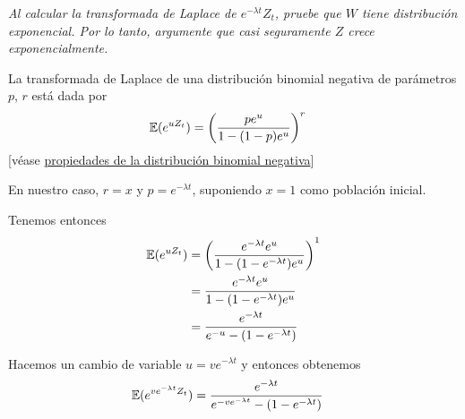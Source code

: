 \emph{
    Al calcular la transformada de Laplace de $e^{-\lambda t}Z_t$, pruebe que $W$ tiene 
    distribuci\'on exponencial. Por lo tanto, argumente que casi seguramente $Z$ crece exponencialmente.
    \pn
}
\afterstatement\pn

La transformada de Laplace de una distribución binomial negativa de parámetros $p$, $r$ está dada por
\begin{align}
        \mathbb{E}(e^{u Z_t})   &=  \left( \frac{p e^u}{1-(1-p)e^u}\right)^r
\end{align}
[véase \href{http://mathworld.wolfram.com/NegativeBinomialDistribution.html}{propiedades de la distribución binomial negativa}]\pn

En nuestro caso, $r = x$ y $p = e^{-\lambda t}$, suponiendo $x=1$ como población inicial.\pn

Tenemos entonces
\begin{align}
        \mathbb{E}(e^{u Z_t})   &=  \left( \frac{e^{-\lambda t} e^u}{1-(1-e^{-\lambda t})e^u}\right)^1       \\
                        &=  \frac{e^{-\lambda t} e^u}{1-(1-e^{-\lambda t})e^u}                       \\ 
                        &=  \frac{e^{-\lambda t}}{e^{-u}-(1-e^{-\lambda t})}                         
\end{align}\pn

Hacemos un cambio de variable $u = v e^{-\lambda t}$ y entonces obtenemos
\begin{align}
    \mathbb{E}(e^{v e^{-\lambda t} Z_t})    &=  \frac{e^{-\lambda t}}{e^{-v e^{-\lambda t}}-(1-e^{-\lambda t})}
\end{align}\pn

